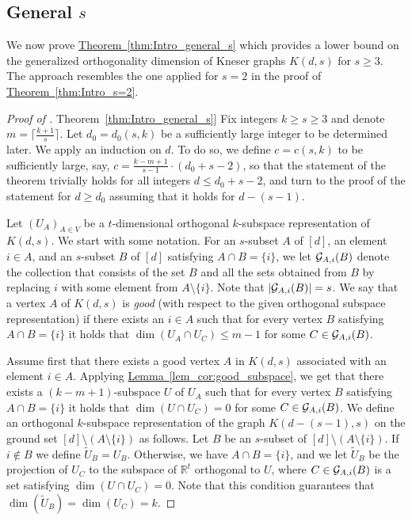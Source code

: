 \documentclass[11pt]{article}
\numberwithin{equation}{section}
\theoremstyle{definition}
\theoremstyle{plain}
\newcommand{\R}{\mathbb R}
\newcommand{\expref}[2]{\hyperref[#2]{#1~\ref{#2}}}
\newcommand{\calG}{{\cal G}}
\begin{document}
\subsection{General \texorpdfstring{$s$}{s}}

We now prove \expref{Theorem}{thm:Intro_general_s}
which provides a lower bound on the generalized orthogonality dimension
%
%
of Kneser graphs $K(d,s)$ for $s \geq 3$.
The approach resembles the one applied for $s=2$ in the proof of \expref{Theorem}{thm:Intro_s=2}.

\begin{proof}[Proof of \expref{Theorem}{thm:Intro_general_s}]
Fix integers $k \geq s \geq 3$ and denote $m = \lceil \frac{k+1}{s} \rceil$.
Let $d_0=d_0(s,k)$ be a sufficiently large integer to be determined later.
We apply an induction on $d$.
To do so, we define $c=c(s,k)$ to be sufficiently large, say, $c=\frac{k-m+1}{s-1} \cdot (d_0+s-2)$, so that the statement of the theorem trivially holds for all integers $d \leq d_0+s-2$, and turn to
%
the proof of %
the statement for $d \geq d_0$ assuming that it holds for $d-(s-1)$.

Let $(U_A)_{A \in V}$ be a $t$-dimensional orthogonal $k$-subspace representation of $K(d,s)$.
We start with some notation.
For an $s$-subset $A$ of $[d]$, an element $i \in A$, and an $s$-subset $B$ of $[d]$ satisfying $A \cap B = \{i\}$, we let $\calG_{A,i}(B)$ denote the collection that consists of the set $B$ and all the sets obtained from $B$ by replacing $i$ with some element from $A \setminus \{i\}$. Note that $|\calG_{A,i}(B)|=s$.
We say that a vertex $A$ of $K(d,s)$ is \emph{good} (with respect to the given orthogonal subspace representation) if there exists an $i \in A$ such that for every vertex $B$ satisfying $A \cap B = \{i\}$ it holds that $\dim(U_A \cap U_C) \leq m-1$ for some $C \in \calG_{A,i}(B)$.

Assume first that there exists a good vertex $A$ in $K(d,s)$ associated with an element $i \in A$.
Applying \expref{Lemma}{lem_cor:good_subspace}, we get that there exists a $(k-m+1)$-subspace $U$ of $U_A$ such that for every vertex $B$ satisfying $A \cap B = \{i\}$ it holds that $\dim(U \cap U_C) =0$ for some $C \in \calG_{A,i}(B)$.
We define an orthogonal $k$-subspace representation of the graph $K(d-(s-1),s)$ on the ground set $[d] \setminus (A \setminus \{i\})$ as follows. Let $B$ be an $s$-subset of $[d] \setminus (A \setminus \{i\})$.
If $i \notin B$ we define $\widetilde{U}_B = U_B$. Otherwise, we have $A \cap B = \{i\}$, and we let $\widetilde{U}_B$ be the projection of $U_C$ to the subspace of $\R^t$ orthogonal to $U$, where $C \in \calG_{A,i}(B)$ is a set satisfying $\dim(U \cap U_C) =0$. Note that this condition guarantees that $\dim(\widetilde{U}_B) = \dim(U_C) = k$.


\end{proof}
\end{document}

